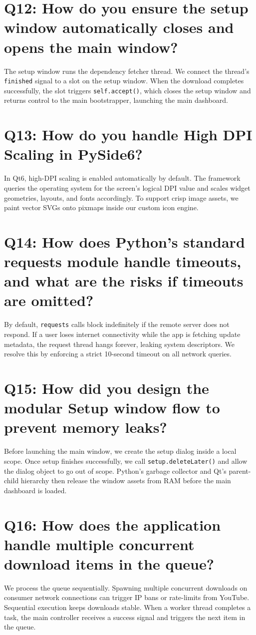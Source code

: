 \documentclass[12pt]{report}
\begin{document}
\section[Question 12]{Q12: How do you ensure the setup window automatically closes and opens the main window?}
The setup window runs the dependency fetcher thread. We connect the thread's \texttt{finished} signal to a slot on the setup window. When the download completes successfully, the slot triggers \texttt{self.accept()}, which closes the setup window and returns control to the main bootstrapper, launching the main dashboard.

\section[Question 13]{Q13: How do you handle High DPI Scaling in PySide6?}
In Qt6, high-DPI scaling is enabled automatically by default. The framework queries the operating system for the screen's logical DPI value and scales widget geometries, layouts, and fonts accordingly. To support crisp image assets, we paint vector SVGs onto pixmaps inside our custom icon engine.

\section[Question 14]{Q14: How does Python's standard requests module handle timeouts, and what are the risks if timeouts are omitted?}
By default, \texttt{requests} calls block indefinitely if the remote server does not respond. If a user loses internet connectivity while the app is fetching update metadata, the request thread hangs forever, leaking system descriptors. We resolve this by enforcing a strict 10-second timeout on all network queries.

\section[Question 15]{Q15: How did you design the modular Setup window flow to prevent memory leaks?}
Before launching the main window, we create the setup dialog inside a local scope. Once setup finishes successfully, we call \texttt{setup.deleteLater()} and allow the dialog object to go out of scope. Python's garbage collector and Qt's parent-child hierarchy then release the window assets from RAM before the main dashboard is loaded.

\section[Question 16]{Q16: How does the application handle multiple concurrent download items in the queue?}
We process the queue sequentially. Spawning multiple concurrent downloads on consumer network connections can trigger IP bans or rate-limits from YouTube. Sequential execution keeps downloads stable. When a worker thread completes a task, the main controller receives a success signal and triggers the next item in the queue.
\end{document}
